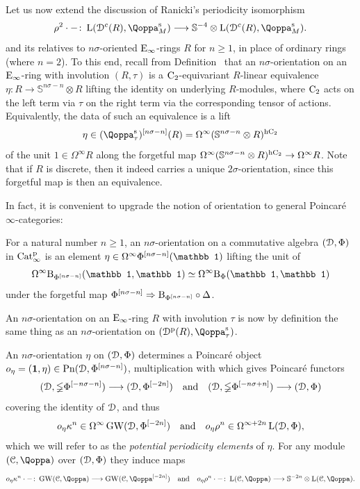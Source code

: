 Let us now extend the discussion of Ranicki's periodicity isomorphism 
\[
\rho^2 \cdot -\colon  \L(\D^c(R),\QF^\sym_M) \longrightarrow \SS^{-4}\otimes \L(\D^c(R),\QF^\sym_{M}).
\]
and its relatives to $n\sigma$-oriented ${\mathrm{E}_{\infty}}$-rings $R$ for $n \geq 1$, in place of ordinary rings (where $n=2$). 
To this end, recall from Definition~ that an $n\sigma$-orientation on an ${\mathrm{E}_{\infty}}$-ring with involution $(R,\tau)$ is a
$\mathrm{C_2}$-equivariant $R$-linear equivalence $\eta\colon R \rightarrow \mathbb S^{n\sigma-n} \otimes R$ %
lifting the identity on underlying $R$-modules, where $\mathrm{C_2}$ acts on the left term via $\tau$ on the right term via the corresponding tensor of actions. %
Equivalently, the data of such an equivalence is a lift 
\[
\eta\in (\QF^{\sym}_{\tau})\qshift{n\sigma-n}(R) = \Omega^\infty (\mathbb S^{n\sigma-n} \otimes R)^\hC
\]
of the unit $1 \in \Omega^\infty R$ along the forgetful map $\Omega^\infty (\mathbb S^{n\sigma-n} \otimes R)^{\mathrm{h}\mathrm{C_2}} \rightarrow \Omega^\infty R$. Note that if $R$ is discrete, then it indeed carries a unique $2\sigma$-orientation, since this forgetful map is then an equivalence. 

In fact, it is convenient to upgrade the notion of orientation to general Poincaré $\infty$-categories:

\begin{definition}
For a natural number $n \geq 1$, an $n\sigma$-orientation on a commutative algebra $(\mathcal{D},\Phi)$ in $\mathrm{Cat}^{\mathrm p}_\infty$ is an element $\eta \in \Omega^\infty\Phi\qshift{n\sigma-n}(\mathbb 1)$ lifting the unit of
\[
\Omega^\infty \Bil_{\Phi\qshift{n\sigma-n}}(\mathbb 1, \mathbb 1) \simeq \Omega^\infty \Bil_{\Phi}(\mathbb 1, \mathbb 1)
\]
under the forgetful map $\Phi^{[n\sigma-n]} \Rightarrow \mathrm{B}_{\Phi^{[n\sigma-n]}} \circ \Delta$. 
\end{definition}

An $n\sigma$-orientation on an ${\mathrm{E}_{\infty}}$-ring $R$ with involution $\tau$ is now by definition the same thing as an $n\sigma$-orientation on $(\Dperf(R),\QF^\sym_\tau)$.   


\begin{construction}
An $n\sigma$-orientation $\eta$ on $(\mathcal{D},\Phi)$ determines a Poincaré object $o_\eta = (\mathbf{1},\eta) \in \mathrm{Pn}(\mathcal{D},\Phi^{[n\sigma-n]})$, multiplication with which gives Poincaré functors
\[
(\mathcal{D},\mathbb \Phi\Phi^{[-n\sigma-n]}) \longrightarrow (\mathcal{D},\Phi^{[-2n]}) \quad \text{and} \quad (\mathcal{D},\mathbb \Phi\Phi^{[-n\sigma+n]}) \longrightarrow (\mathcal{D},\Phi)
\]
covering the identity of $\mathcal{D}$, and thus
\[
o_{\eta}\kappa^n \in \Omega^{\infty}\operatorname{GW}(\mathcal{D},\Phi^{[-2n]}) \quad \text{and} \quad o_{\eta}\rho^n \in \Omega^{\infty+2n}\operatorname L(\mathcal{D},\Phi),
\]
which we will refer to as the \emph{potential periodicity elements} of $\eta$. For any module $(\C,\QF)$ over $(\mathcal{D},\Phi)$ they induce maps
\[
o_{\eta}\kappa^n \cdot - \colon \GW(\C,\QF) \longrightarrow \GW(\C,\QF\qshift{-2n}) \quad \text{and} \quad  o_{\eta}\rho^n \cdot - \colon \L(\C,\QF) \longrightarrow \SS^{-2n}\otimes \L(\C,\QF).
\]
\end{construction}



